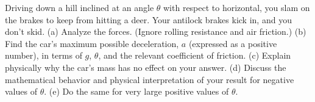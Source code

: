 Driving down a hill inclined at an angle $\theta $ with
respect to horizontal, you slam on the brakes to keep from
hitting a deer. Your antilock brakes kick in, and you don't skid.\hwendpart
 (a) Analyze the forces. (Ignore rolling
resistance and air friction.)\hwendpart
 (b) Find the car's maximum
possible deceleration, $a$ (expressed as a positive number),
in terms of $g$, $\theta$, and the relevant coefficient of
friction.\answercheck\hwendpart
 (c) Explain physically why the car's mass has no
effect on your answer.\hwendpart
 (d) Discuss the mathematical behavior
and physical interpretation of your result for negative
values of $\theta $.\hwendpart
 (e) Do the same for very large positive
values of $\theta $.
